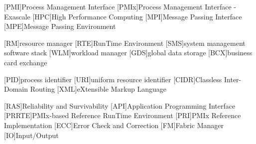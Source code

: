 
\makeindex[intoc,columns=2]

  {\usepackage[printwatermark]{xwatermark}
  }{}

\usepackage{acronym}
[PMI]{Process Management Interface}
[PMIx]{Process Management Interface - Exascale}
[HPC]{High Performance Computing}
[MPI]{Message Passing Interface}
[MPE]{Message Passing Environment}

[RM]{resource manager}
[RTE]{RunTime Environment}
[SMS]{system management software stack}
[WLM]{workload manager}
[GDS]{global data storage}
[BCX]{business card exchange}

[PID]{process identifier}
[URI]{uniform resource identifier}
[CIDR]{Classless Inter-Domain Routing}
[XML]{eXtensible Markup Language}

[RAS]{Reliability and Survivability}
[API]{Application Programming Interface}
[PRRTE]{PMIx-based Reference RunTime Environment}
[PRI]{PMIx Reference Implementation}
[ECC]{Error Check and Correction}
[FM]{Fabric Manager}
[IO]{Input/Output}




%
%
    

%
%
    \setcounter{page}{0}
    \setcounter{tocdepth}{2}

    \begin{spacing}{1.3}
        \tableofcontents
    \end{spacing}

%
%
    \linenumbers\pagewiselinenumbers
    \newpage{}
    \setcounter{chapter}{0}  %

